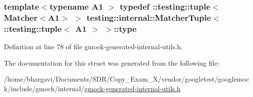 \subsubsection[{\texorpdfstring{type}{type}}]{\setlength{\rightskip}{0pt plus 5cm}template$<$typename A1 $>$ typedef \+::testing\+::tuple$<${\bf Matcher}$<$A1$>$ $>$ {\bf testing\+::internal\+::\+Matcher\+Tuple}$<$ \+::testing\+::tuple$<$ A1 $>$ $>$\+::{\bf type}}\hypertarget{structtesting_1_1internal_1_1_matcher_tuple_3_01_1_1testing_1_1tuple_3_01_a1_01_4_01_4_a8463ac100366f7e8b6ad1035e42ec4b0}{}\label{structtesting_1_1internal_1_1_matcher_tuple_3_01_1_1testing_1_1tuple_3_01_a1_01_4_01_4_a8463ac100366f7e8b6ad1035e42ec4b0}


Definition at line 78 of file gmock-\/generated-\/internal-\/utils.\+h.



The documentation for this struct was generated from the following file\+:\begin{DoxyCompactItemize}
\item 
/home/bhargavi/\+Documents/\+S\+D\+R/\+Copy\+\_\+\+Exam\+\_\+X/vendor/googletest/googlemock/include/gmock/internal/\hyperlink{gmock-generated-internal-utils_8h}{gmock-\/generated-\/internal-\/utils.\+h}\end{DoxyCompactItemize}

